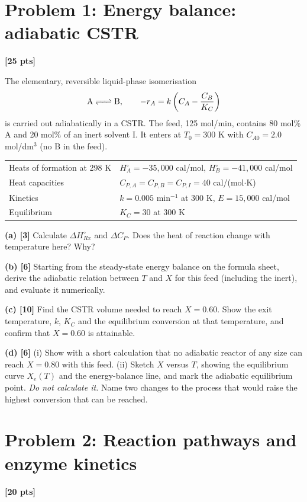 \documentclass[11pt]{article}
\newcommand{\problem}[2]{\section*{Problem #1: #2}}
\newcommand{\pts}[1]{\hfill\textbf{[#1 pts]}}
\newcommand{\workspace}[1]{\par\vspace{#1}}
\begin{document}
\newpage
\problem{1}{Energy balance: adiabatic CSTR}\pts{25}

The elementary, reversible liquid-phase isomerisation
\[
\ce{A <=> B},\qquad -r_A=k\left(C_A-\frac{C_B}{K_C}\right)
\]
is carried out adiabatically in a CSTR. The feed, 125 mol/min, contains 80 mol\% A and 20 mol\% of an inert solvent I.
It enters at $T_0=300$ K with $C_{A0}=2.0$ mol/dm$^3$ (no B in the feed).

\begin{center}
\renewcommand{\arraystretch}{1.25}
\begin{tabular}{ll}
\toprule
Heats of formation at 298 K & $H_A^\circ=-35{,}000$ cal/mol, \quad $H_B^\circ=-41{,}000$ cal/mol\\
Heat capacities & $C_{P,A}=C_{P,B}=C_{P,I}=40$ cal/(mol$\cdot$K)\\
Kinetics & $k=0.005$ min$^{-1}$ at 300 K, \quad $E=15{,}000$ cal/mol\\
Equilibrium & $K_C=30$ at 300 K\\
\bottomrule
\end{tabular}
\end{center}

\textbf{(a) [3]} Calculate $\Delta H^\circ_{Rx}$ and $\Delta C_P$. Does the heat of reaction change with temperature here? Why?
\workspace{3.2cm}

\textbf{(b) [6]} Starting from the steady-state energy balance on the formula sheet, derive the adiabatic relation between
$T$ and $X$ for this feed (including the inert), and evaluate it numerically.
\workspace{6cm}

\newpage
\textbf{(c) [10]} Find the CSTR volume needed to reach $X=0.60$. Show the exit temperature, $k$, $K_C$ and the equilibrium
conversion at that temperature, and confirm that $X=0.60$ is attainable.
\workspace{9.5cm}

\textbf{(d) [6]} (i) Show with a short calculation that no adiabatic reactor of any size can reach $X=0.80$ with this feed.
(ii) Sketch $X$ versus $T$, showing the equilibrium curve $X_e(T)$ and the energy-balance line, and mark the adiabatic
equilibrium point. \emph{Do not calculate it.} Name two changes to the process that would raise the highest conversion
that can be reached.
\workspace{7cm}

\newpage
\problem{2}{Reaction pathways and enzyme kinetics}\pts{20}
\end{document}
